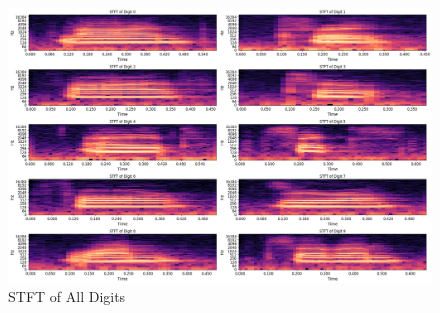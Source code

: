 \documentclass[12pt]{article}
\begin{document}
\begin{figure}[h!]
    \centering
    \includegraphics[width=0.9\linewidth]{figures/spectrogram_all.png}
    \caption{STFT of All Digits}
    \label{fig:enter-label}
\end{figure}
\end{document}
